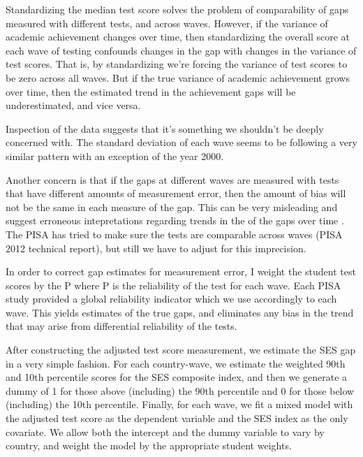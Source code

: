 \documentclass[11pt, a4paper]{article}\usepackage[]{graphicx}\usepackage[]{color}
\begin{document}
Standardizing the median test score solves the problem of comparability of gaps measured with different tests, and across waves. However, if the variance of academic achievement changes over time, then standardizing the overall score at each wave of testing confounds changes in the gap with changes in the variance of test scores. That is, by standardizing we're forcing the variance of test scores to be zero across all waves. But if the true variance of academic achievement grows over time, then the estimated trend in the achievement gaps will be underestimated, and vice versa.



Inspection of the data suggests that it's something we shouldn't be deeply concerned with. The standard deviation of each wave seems to be following a very similar pattern with an exception of the year 2000.

Another concern is that if the gaps at different waves are measured with tests that have different amounts of measurement error, then the amount of bias will not be the same in each measure of the gap. This can be very misleading and suggest erroneous intepretations regarding trends in the of the gaps over time \citet{reardon2011}. The PISA has tried to make sure the tests are comparable across waves (PISA 2012 technical report), but still we have to adjust for this imprecision.

In order to correct gap estimates for measurement error, I weight the student test scores by the P where P is the reliability of the test for each wave. Each PISA study provided a global reliability indicator which we use accordingly to each wave. This yields estimates of the true gaps, and eliminates any bias in the trend that may arise from differential reliability of the tests.

After constructing the adjusted test score measurement, we estimate the SES gap in a very simple fashion. For each country-wave, we estimate the weighted 90th and 10th percentile scores for the SES composite index, and then we generate a dummy of 1 for those above (including) the 90th percentile and 0 for those below (including) the 10th percentile. Finally, for each wave, we fit a mixed model with the adjusted test score as the dependent variable and the SES index as the only covariate. We allow both the intercept and the dummy variable to vary by country, and weight the model by the appropriate student weights.
\end{document}
